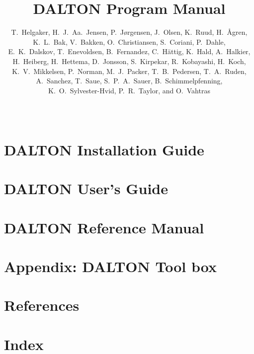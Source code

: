 \documentclass[11pt]{report}
\begin{document}
%

%
\baselineskip=15pt
%
\title{DALTON Program Manual}

%
\author{T.~Helgaker, H.~J.~Aa.~Jensen, P.~J{\o}rgensen, J.~Olsen,
K.~Ruud, H.~{\AA}gren,\smallskip\\ 
K.~L.~Bak, 
V.~Bakken,
O.~Christiansen, 
S.~Coriani, 
P.~Dahle,\\
E.~K.~Dalskov,
T.~Enevoldsen, 
B.~Fernandez,
C.~H{\"a}ttig,
K.~Hald,
A.~Halkier,\\
H.~Heiberg,
H.~Hettema, 
D.~Jonsson, 
S.~Kirpekar,
R.~Kobayashi,
H.~Koch,\\
K.~V.~Mikkelsen,
P.~Norman, 
M.~J.~Packer, 
T.~B.~Pedersen,
T.~A.~Ruden,\\
A.~Sanchez,
T.~Saue,
S.~P.~A.~Sauer,
B.~Schimmelpfenning,\\
K.~O.~Sylvester-Hvid,
P.~R.~Taylor, 
and O.~Vahtras}  
%
\date{\mbox{\ }}
%
\maketitle
%



\part{DALTON Installation Guide}


\part{DALTON User's Guide}














\part{DALTON Reference Manual}






















\part{Appendix: DALTON Tool box}

\part{References}

%
\part{Index}
\printindex
\end{document}
